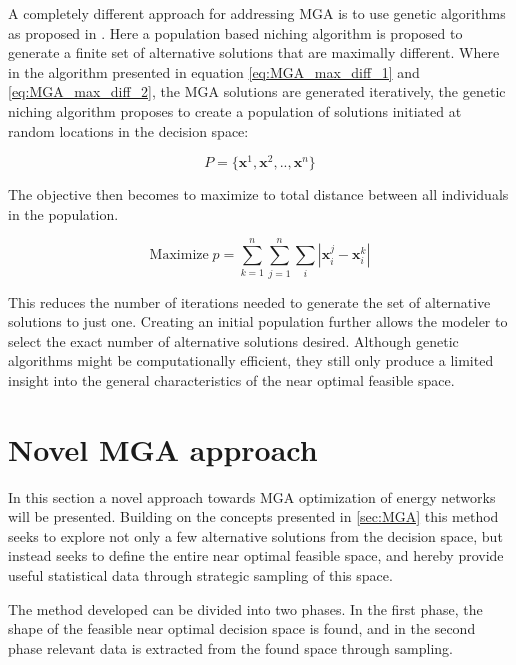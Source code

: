A completely different approach for addressing MGA is to use genetic algorithms as proposed in \cite{Genetic_Algorithms_for_MGA}. Here a population based niching algorithm is proposed to generate a finite set of alternative solutions that are maximally different. Where in the algorithm presented in equation \ref{eq:MGA_max_diff_1} and \ref{eq:MGA_max_diff_2}, the MGA solutions are generated iteratively, the genetic niching algorithm proposes to create a population of solutions initiated at random locations in the decision space:

\begin{equation}
	P = \{\mathbf{x}^1,\mathbf{x}^2,..,\mathbf{x}^n \}
\end{equation}

The objective then becomes to maximize to total distance between all individuals in the population. 

\begin{equation}
\text{Maximize}	\; p = \sum_{k=1}^{n} \sum_{j=1}^{n} \sum_i |\mathbf{x}_i^j - \mathbf{x}_i^k|
\end{equation}

This reduces the number of iterations needed to generate the set of alternative solutions to just one. Creating an initial population further allows the modeler to select the exact number of alternative solutions desired. 
Although genetic algorithms might be computationally efficient, they still only produce a limited insight into the general characteristics of the near optimal feasible space. 

\section{Novel MGA approach}\label{sec:Novel_MGA}

In this section a novel approach towards MGA optimization of energy networks will be presented. Building on the concepts presented in \ref{sec:MGA} this method seeks to explore not only a few alternative solutions from the decision space, but instead seeks to define the entire near optimal feasible space, and hereby provide useful statistical data through strategic sampling of this space. 

The method developed can be divided into two phases. In the first phase, the shape of the feasible near optimal decision space is found, and in the second phase relevant data is extracted from the found space through sampling. 

